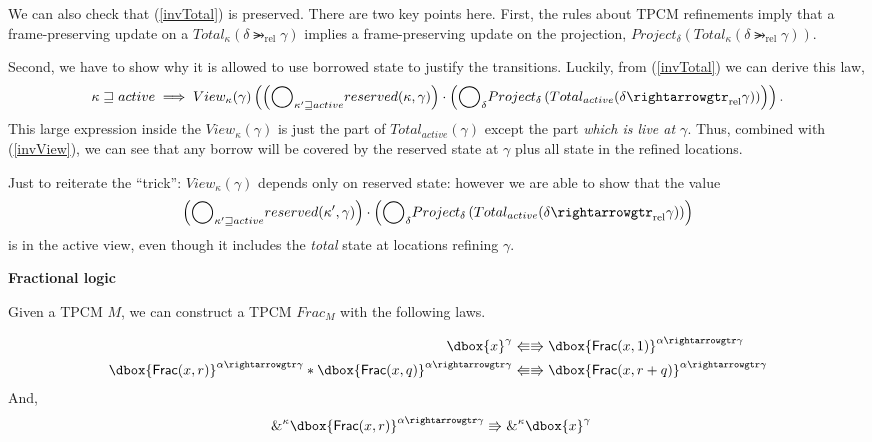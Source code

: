 \documentclass{article}
\newcommand\dboxed[1]{\dbox{\vphantom{t}\ensuremath{#1}}}
\newcommand{\viewshift}{\Rrightarrow}
\newcommand{\viewshiftBack}{\Lleftarrow}
\DeclareMathOperator{\rel}{rel}
\newcommand{\borrow}[2]{\textsc{\&}^{#1}#2}
\newcommand{\refines}{\rightarrowgtr}
\newcommand{\ltGe}{\sqsupseteq}
\newcommand\Bigcircle{\raisebox{-0.5mm}{\scalebox{1.7}{$\bigcirc$}}}
\begin{document}
We can also check that (\ref{invTotal}) is preserved. There are two key points here.
First, the rules about TPCM refinements imply that a frame-preserving update on a
$Total_\kappa(\delta \refines_{\rel} \gamma)$ implies a frame-preserving update
on the projection,
$Project_\delta(Total_\kappa(\delta \refines_{\rel} \gamma))$.

Second, we have to show why it is allowed to use borrowed state to justify the transitions.
Luckily, from (\ref{invTotal}) we can derive this law,
\[
  \kappa \ltGe active \implies View_\kappa(\gamma)\left(
      \left(
        \Bigcircle_{\kappa' \ltGe active} reserved(\kappa,\gamma)
      \right) \cdot
      \left(
        \Bigcircle_{\delta} Project_\delta\left(Total_{active}(\delta \refines_{\rel} \gamma)\right)
      \right)
    \right).
    \label{invDerived}
\]
This large expression inside the $View_\kappa(\gamma)$ is just the part of
$Total_{active}(\gamma)$ except the part \emph{which is live at $\gamma$}.
Thus, combined with (\ref{invView}), we can see that any borrow will be covered by the reserved 
state at $\gamma$ plus all state in the refined locations.

Just to reiterate the ``trick'': $View_\kappa(\gamma)$ depends only on reserved state:
however we are able to show that the value \[\left(
        \Bigcircle_{\kappa' \ltGe active} reserved(\kappa',\gamma)
      \right) \cdot
      \left(
        \Bigcircle_{\delta} Project_\delta\left(Total_{active}(\delta \refines_{\rel} \gamma)\right)
      \right)\] is in the active view, even though it includes the \emph{total} state at locations refining $\gamma$.

\textbf{Fractional logic}

Given a TPCM $M$, we can construct a TPCM $Frac_M$ with the following laws.

\newcommand{\FFrac}{\textsf{Frac}}

\begin{align*}
  \dboxed{x}^\gamma &\viewshiftBack \viewshift \dboxed{\FFrac(x, 1)}^{\alpha \refines \gamma}\\
  \dboxed{\FFrac(x, r)}^{\alpha \refines \gamma}
    *
  \dboxed{\FFrac(x, q)}^{\alpha \refines \gamma}
    &\viewshiftBack \viewshift
  \dboxed{\FFrac(x, r+q)}^{\alpha \refines \gamma}
\end{align*}
And,
\begin{align*}
  \borrow{\kappa}{\dboxed{\FFrac(x, r)}^{\alpha \refines \gamma}} &\viewshift
  \borrow{\kappa}{\dboxed{x}^\gamma}
\end{align*}
\end{document}
